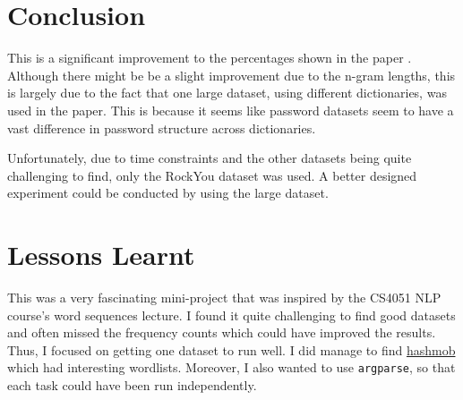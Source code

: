 \section{Conclusion}
This is a significant improvement to the percentages shown in the paper \cite{Max}. Although there might be be a slight improvement due to the n-gram lengths, this is largely due to the fact that one large dataset, using different dictionaries, was used in the paper. This is because it seems like password datasets seem to have a vast difference in password structure across dictionaries. 

 Unfortunately, due to time constraints and the other datasets being quite challenging to find, only the RockYou dataset was used. A better designed experiment could be conducted by using the large dataset.
\section{Lessons Learnt}
This was a very fascinating mini-project that was inspired by the CS4051 NLP course's word sequences lecture. I found it quite challenging to find good datasets and often missed the frequency counts which could have improved the results. Thus, I focused on getting one dataset to run well. I did manage to find \href{https://hashmob.net/}{hashmob} which had interesting wordlists. Moreover, I also wanted to use \verb|argparse|, so that each task could have been run independently.